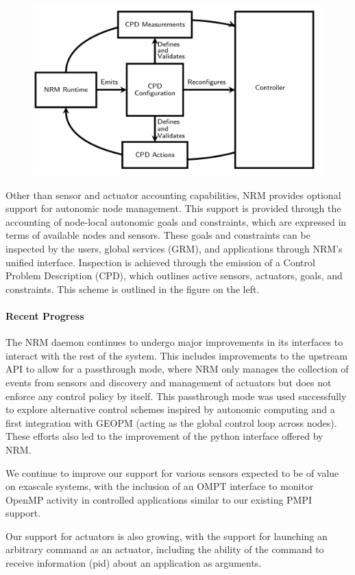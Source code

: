 \begin{figure}
\includegraphics[width=.38\textwidth]{projects/2.3.1-PMR/2.3.1.19-Argo-PowerSteering/cpd}
\end{figure}
Other than sensor and actuator accounting capabilities, NRM provides
optional support for autonomic node management. This support is provided through
the accounting of node-local autonomic goals and constraints, which are
expressed in terms of available nodes and sensors. These goals and
constraints can be inspected by the users, global services (GRM), and
applications through NRM's unified interface. Inspection is achieved through
the emission of a Control Problem Description (CPD), which outlines active
sensors, actuators, goals, and constraints. This scheme is outlined in the
figure on the left.

\paragraph{Recent Progress}

The NRM daemon continues to undergo major improvements in its interfaces to
interact with the rest of the system. This includes improvements to the
upstream API to allow for a passthrough mode, where NRM only manages the
collection of events from sensors and discovery and management of actuators
but does not enforce any control policy by itself. This passthrough mode
was used successfully to explore alternative control schemes inspired by
autonomic computing and a first integration with GEOPM (acting as the
global control loop across nodes). These efforts also led to the
improvement of the python interface offered by NRM.

We continue to improve our support for various sensors expected to be of
value on exascale systems, with the inclusion of an OMPT interface to
monitor OpenMP activity in controlled applications similar to our existing
PMPI support. 

Our support for actuators is also growing, with the support for launching
an arbitrary command as an actuator, including the ability of the command
to receive information (pid) about an application as arguments. 

